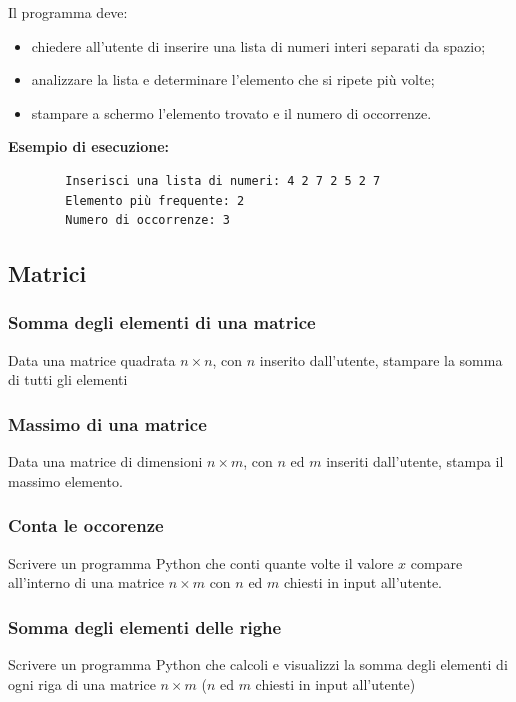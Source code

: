 \documentclass[a4paper,12pt]{article}
\begin{document}
	Il programma deve:
	\begin{itemize}
		\item chiedere all’utente di inserire una lista di numeri interi separati da spazio;
		\item analizzare la lista e determinare l’elemento che si ripete più volte;
		\item stampare a schermo l’elemento trovato e il numero di occorrenze.
	\end{itemize}
	
	\textbf{Esempio di esecuzione:}
	\begin{verbatim}
		Inserisci una lista di numeri: 4 2 7 2 5 2 7
		Elemento più frequente: 2
		Numero di occorrenze: 3
	\end{verbatim}
	
	\newpage
	
	\subsection{Matrici}
	
	\subsubsection{Somma degli elementi di una matrice}
	Data una matrice quadrata $n \times n$, con $n$ inserito dall'utente, stampare la somma di tutti gli elementi
	
	\subsubsection{Massimo di una matrice}
	Data una matrice di dimensioni $n \times m$, con $n$ ed $m$ inseriti dall'utente, stampa il massimo elemento.
	
	\subsubsection{Conta le occorenze}
	Scrivere un programma Python che conti quante volte il valore $x$ compare all'interno di una matrice $n \times m$ con $n$ ed $m$ chiesti in input all'utente.
	
	\subsubsection{Somma degli elementi delle righe}
	Scrivere un programma Python che calcoli e visualizzi la somma degli elementi di ogni riga di una matrice $n \times m$ ($n$ ed $m$ chiesti in input all'utente)
	
\end{document}
